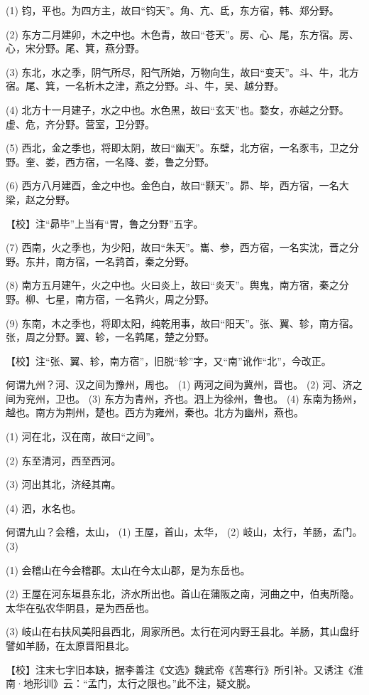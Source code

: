 \documentclass[12pt,UTF8]{ctexbook}
\begin{document}
(1) 钧，平也。为四方主，故曰“钧天”。角、亢、氐，东方宿，韩、郑分野。

(2) 东方二月建卯，木之中也。木色青，故曰“苍天”。房、心、尾，东方宿。房、心，宋分野。尾、箕，燕分野。

(3) 东北，水之季，阴气所尽，阳气所始，万物向生，故曰“变天”。斗、牛，北方宿。尾、箕，一名析木之津，燕之分野。斗、牛，吴、越分野。

(4) 北方十一月建子，水之中也。水色黑，故曰“玄天”也。婺女，亦越之分野。虚、危，齐分野。营室，卫分野。

(5) 西北，金之季也，将即太阴，故曰“幽天”。东壁，北方宿，一名豕韦，卫之分野。奎、娄，西方宿，一名降、娄，鲁之分野。

(6) 西方八月建酉，金之中也。金色白，故曰“颢天”。昴、毕，西方宿，一名大梁，赵之分野。

【校】注“昴毕”上当有“胃，鲁之分野”五字。

(7) 西南，火之季也，为少阳，故曰“朱天”。巂、参，西方宿，一名实沈，晋之分野。东井，南方宿，一名鹑首，秦之分野。

(8) 南方五月建午，火之中也。火曰炎上，故曰“炎天”。舆鬼，南方宿，秦之分野。柳、七星，南方宿，一名鹑火，周之分野。

(9) 东南，木之季也，将即太阳，纯乾用事，故曰“阳天”。张、翼、轸，南方宿。张，周之分野。翼、轸，一名鹑尾，楚之分野。

【校】注“张、翼、轸，南方宿”，旧脱“轸”字，又“南”讹作“北”，今改正。

何谓九州？河、汉之间为豫州，周也。 (1) 两河之间为冀州，晋也。 (2) 河、济之间为兖州，卫也。 (3) 东方为青州，齐也。泗上为徐州，鲁也。 (4) 东南为扬州，越也。南方为荆州，楚也。西方为雍州，秦也。北方为幽州，燕也。

(1) 河在北，汉在南，故曰“之间”。

(2) 东至清河，西至西河。

(3) 河出其北，济经其南。

(4) 泗，水名也。

何谓九山？会稽，太山， (1) 王屋，首山，太华， (2) 岐山，太行，羊肠，孟门。 (3)

(1) 会稽山在今会稽郡。太山在今太山郡，是为东岳也。

(2) 王屋在河东垣县东北，济水所出也。首山在蒲阪之南，河曲之中，伯夷所隐。太华在弘农华阴县，是为西岳也。

(3) 岐山在右扶风美阳县西北，周家所邑。太行在河内野王县北。羊肠，其山盘纡譬如羊肠，在太原晋阳县北。

【校】注末七字旧本缺，据李善注《文选》魏武帝《苦寒行》所引补。又诱注《淮南·地形训》云：“孟门，太行之限也。”此不注，疑文脱。
\end{document}
